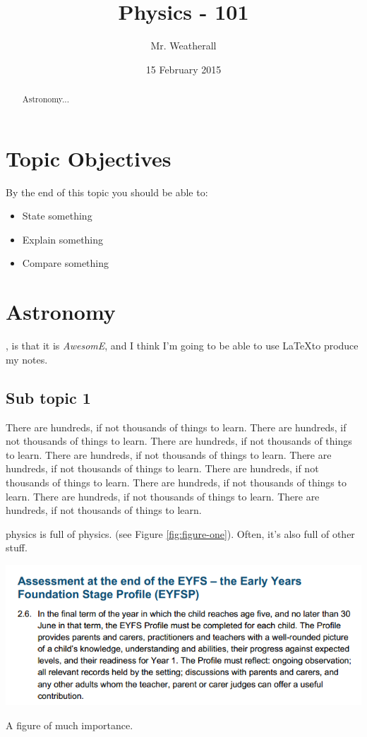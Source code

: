 \documentclass{tufte-handout}
\title{Physics - 101}
\author{Mr. Weatherall}
\date{15 February 2015}  %
\begin{document}
\maketitle%

\begin{abstract}
\noindent Astronomy...
\end{abstract}

\section{Topic Objectives}
By the end of this topic you should be able to:
\begin{itemize}
\item State something
\item Explain something
\item Compare something
\end{itemize}

\pagebreak

\section{Astronomy}

, is that it is \emph{AwesomE}, and I think I'm going to be able to use \LaTeX to produce my notes.

\subsection{Sub topic 1}

There are hundreds, if not thousands of things to learn. There are hundreds, if not thousands of things to learn. There are hundreds, if not thousands of things to learn. There are hundreds, if not thousands of things to learn. There are hundreds, if not thousands of things to learn. There are hundreds, if not thousands of things to learn. There are hundreds, if not thousands of things to learn. There are hundreds, if not thousands of things to learn. There are hundreds, if not thousands of things to learn.  

 physics is full of physics. (see Figure \ref{fig:figure-one}).  Often, it's also full of other stuff.

\begin{marginfigure}[0in]
  \includegraphics{figures/testimage}
  \caption{A figure of much importance.}
    \label{fig:figure-one}
\end{marginfigure}
\end{document}
